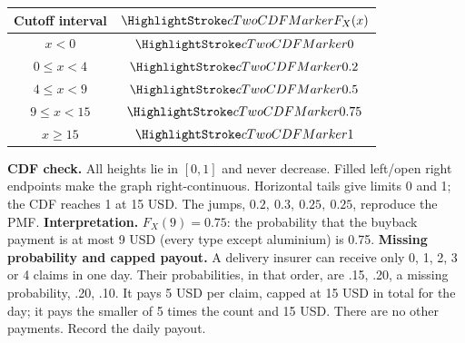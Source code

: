 \par\noindent\begin{minipage}[t]{.37\linewidth}\vspace{0pt}\centering
\begin{tabular}{cc}\toprule
Cutoff interval & $\cTwoCDFHL{F_X(x)}$ \\ \midrule
$x<0$ & $\cTwoCDFHL{0}$ \\
$0\leq x<4$ & $\cTwoCDFHL{0.2}$ \\
$4\leq x<9$ & $\cTwoCDFHL{0.5}$ \\
$9\leq x<15$ & $\cTwoCDFHL{0.75}$ \\
$x\geq 15$ & $\cTwoCDFHL{1}$ \\
\bottomrule\end{tabular}
\end{minipage}\hfill\begin{minipage}[t]{.60\linewidth}\vspace{0pt}\centering
{}
\end{minipage}\par
\textbf{CDF check.} All heights lie in $[0,1]$ and never decrease. Filled left/open right endpoints make the graph right-continuous. Horizontal tails give limits 0 and 1; the CDF reaches 1 at 15 USD. The jumps, $0.2,\ 0.3,\ 0.25,\ 0.25$, reproduce the PMF.
\textbf{Interpretation.} $F_X(9)=0.75$: the probability that the buyback payment is at most 9 USD (every type except aluminium) is 0.75.
\vfill
\clearpage
{}
\textbf{Missing probability and capped payout.} A delivery insurer can receive only 0, 1, 2, 3 or 4 claims in one day. Their probabilities, in that order, are .15, .20, a missing probability, .20, .10. It pays 5 USD per claim, capped at 15 USD in total for the day; it pays the smaller of 5 times the count and 15 USD. There are no other payments. Record the daily payout.
